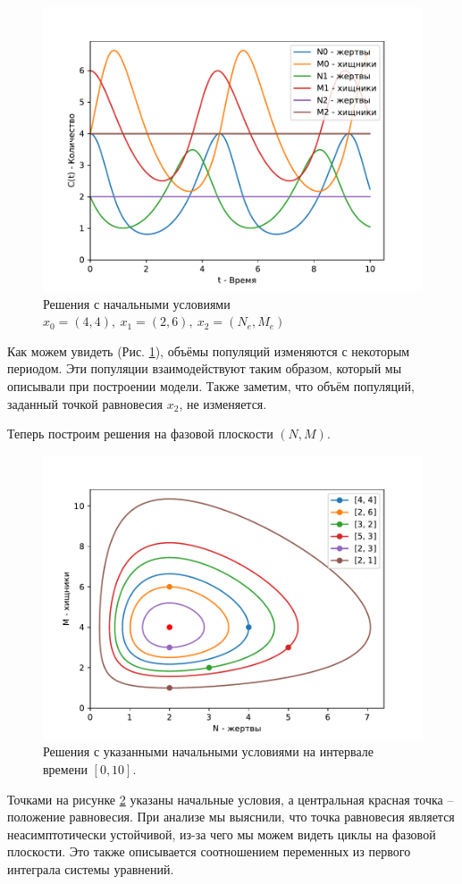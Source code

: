         \begin{figure}[H]
            \centering
            \includegraphics[width=15cm]{pictures/population.pdf} 
            \caption{Решения с начальными условиями $x_0=(4,4), ~ x_1 = (2,6), ~ x_2 = (N_e, M_e)$}\label{exp1t}
        \end{figure}
        Как можем увидеть (Рис. \ref{exp1t}), объёмы популяций изменяются с некоторым периодом. Эти популяции взаимодействуют таким образом, который мы описывали при построении модели. Также заметим, что объём популяций, заданный точкой равновесия $ x_2 $, не изменяется.


        Теперь построим решения на фазовой плоскости $ (N, M) $.
        \begin{figure}[H]
            \centering
            \includegraphics[width=15cm]{pictures/population3.pdf}
            \caption{Решения с указанными начальными условиями на интервале времени $ [0, 10] $.}\label{exp1p}
        \end{figure}
        Точками на рисунке \ref{exp1p} указаны начальные условия, а центральная красная точка -- положение равновесия.
        При анализе мы выяснили, что точка равновесия является неасимптотически устойчивой, из-за чего мы можем видеть циклы на фазовой плоскости. Это также описывается соотношением переменных из первого интеграла системы уравнений.

